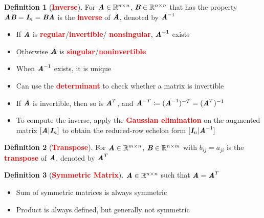 \documentclass[12pt]{article}
\theoremstyle{definition}
\newtheorem{definition}{Definition}[section]
\newcommand{\keyword}[1]{\textbf{\textcolor{red}{#1}}}
\newcommand{\mat}[1]{\textit{\textbf{#1}}}
\newcommand{\inverse}[1]{\textit{\textbf{#1}}^{-1}}
\newcommand{\transpose}[1]{\textit{\textbf{#1}}^{T}}
\newcommand{\rspace}[2]{\mathbb{R}^{#1 \times #2}}
\begin{document}
            \begin{definition}[\keyword{Inverse}]
                For $\mat{A}\in\rspace{n}{n}$, $\mat{B}\in\rspace{n}{n}$ 
                that has the property $\mat{A}\mat{B}=\mat{I}_n=\mat{B}\mat{A}$ 
                is the \keyword{inverse} of $\mat{A}$, denoted by $\inverse{A}$
                \begin{itemize}
                    \item If $\mat{A}$ is \keyword{regular}/\keyword{invertible}/
                        \keyword{nonsingular}, $\inverse{A}$ exists
                    \item Otherwise $\mat{A}$ is \keyword{singular}/\keyword{noninvertible}
                    \item When $\inverse{A}$ exists, it is unique
                    \item Can use the \keyword{determinant} to check whether a
                        matrix is invertible
                    \item If $\mat{A}$ is invertible, then so is $\transpose{A}$, 
                        and $\mat{A}^{-T}\coloneqq (\inverse{A})^{-T} = (\transpose{A})^{-1}$
                    \item To compute the inverse, apply the \keyword{Gaussian elimination}
                        on the augmented matrix $[\mat{A}|\mat{I}_n]$ to obtain 
                        the reduced-row echelon form $[\mat{I}_n|\inverse{A}]$
                \end{itemize}
            \end{definition}
            \begin{definition}[\keyword{Transpose}]
                For $\mat{A}\in\rspace{m}{n}$, $\mat{B}\in\rspace{n}{m}$ with
                $b_{ij} = a_{ji}$ is the \keyword{transpose} of $\mat{A}$, 
                denoted by $\transpose{A}$ 
            \end{definition}
            \begin{definition}[\keyword{Symmetric Matrix}]
                $\mat{A}\in\rspace{n}{n}$ such that $\mat{A}=\transpose{A}$
                \begin{itemize}
                    \item Sum of symmetric matrices is always symmetric
                    \item Product is always defined, but generally not symmetric
                \end{itemize}
            \end{definition}
\end{document}
